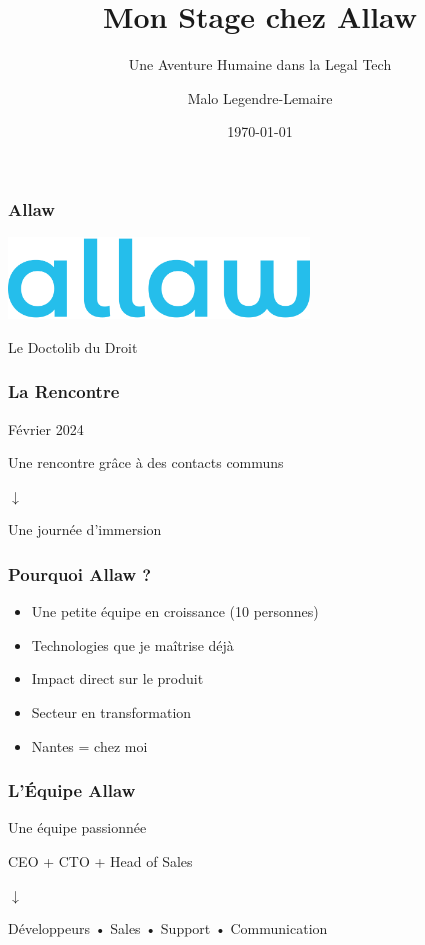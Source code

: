 \documentclass{beamer}
\title{Mon Stage chez Allaw}
\subtitle{Une Aventure Humaine dans la Legal Tech}
\author{Malo Legendre-Lemaire}
\date{\today}
\institute{EPITA - Promo 2026}
\begin{document}
\frame{\titlepage}

\begin{frame}
\frametitle{Allaw}
\begin{center}
\includegraphics[width=0.6\textwidth]{../media/allaw.png}

\vspace{1cm}
{\Large Le Doctolib du Droit}
\end{center}
\end{frame}

\begin{frame}
\frametitle{La Rencontre}
\begin{center}
{\Large Février 2024}

\vspace{1cm}
Une rencontre grâce à des contacts communs

\vspace{1cm}
$\downarrow$

\vspace{1cm}
Une journée d'immersion
\end{center}
\end{frame}

\begin{frame}
\frametitle{Pourquoi Allaw ?}
\begin{itemize}
\item Une petite équipe en croissance (10 personnes)
\item Technologies que je maîtrise déjà
\item Impact direct sur le produit
\item Secteur en transformation
\item Nantes = chez moi
\end{itemize}
\end{frame}

\begin{frame}
\frametitle{L'Équipe Allaw}
\begin{center}
{\Large Une équipe passionnée}

\vspace{1cm}
CEO + CTO + Head of Sales

\vspace{0.5cm}
$\downarrow$

\vspace{0.5cm}
Développeurs • Sales • Support • Communication
\end{center}
\end{frame}
\end{document}

